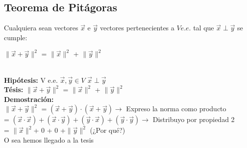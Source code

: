 \documentclass{article}
\begin{document}
\subsection{Teorema de Pitágoras}
Cualquiera sean vectores $\vec{x}$ e $\vec{y}$ vectores pertenecientes a $V e.e.$ tal que $\vec{x}\perp\vec{y}$ se cumple: \\
\centerline {$\parallel\vec{x}+\vec{y}\parallel^2$ = $\parallel\vec{x}\parallel^2$ + $\parallel\vec{y}\parallel^2$}\\
\textbf{Hipótesis:} V e.e. $\vec{x}, \vec{y} \in V$ $\vec{x}\perp\vec{y}$\\
\textbf{Tésis:} $\parallel\vec{x}+\vec{y}\parallel^2$ = $\parallel\vec{x}\parallel^2$ + $\parallel\vec{y}\parallel^2$ \\
\textbf {Demostración:}\\
$\parallel\vec{x}+\vec{y}\parallel^2$ = $(\vec{x} + \vec{y})\cdot(\vec{x} + \vec{y}) \rightarrow$ Expreso la norma como producto \\ 
 = $(\vec{x}\cdot\vec{x}) + (\vec{x}\cdot\vec{y}) + (\vec{y}\cdot\vec{x})+ (\vec{y}\cdot\vec{y}) \rightarrow$ Distribuyo por propiedad 2 \\
 = $\parallel\vec{x}\parallel^2$+  0  +  0  +$\parallel\vec{y}\parallel^2$ (¿Por qué?) \\
O sea hemos llegado a la tesis
\end{document}
